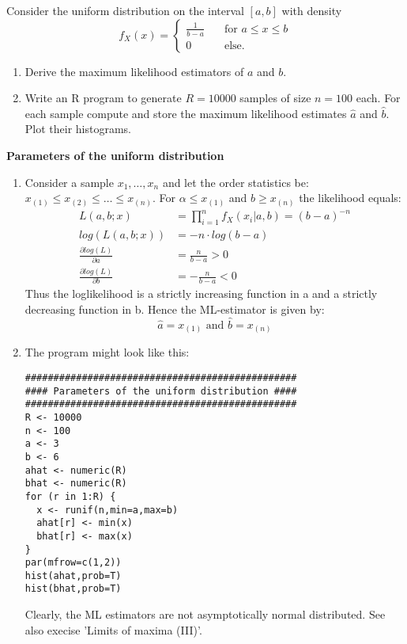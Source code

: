 \documentclass{article}
\begin{document}
Consider the uniform distribution on the interval $[a,b]$ with density%
\begin{equation*}
f_{X}(x)=\left\{
\begin{array}{ll}
\frac{1}{b-a} & \quad \text{for }a\leq x\leq b \\
0 & \quad \text{else.}%
\end{array}%
\right.
\end{equation*}

\begin{enumerate}
\item Derive the maximum likelihood estimators of $a$ and $b$.

\item Write an R program to generate $R=10000$ samples of size $n=100$ each.
For each sample compute and store the maximum likelihood estimates $\hat{a}$
and $\hat{b}$. Plot their histograms.
\end{enumerate}

\begin{solution}
\textbf{Parameters of the uniform distribution}
\begin{enumerate}
  \item Consider a sample $x_1,\dots,x_n$ and let the order statistics
      be: $x_{(1)} \leq x_{(2)} \leq \dots \leq x_{(n)}$. For $\alpha
      \leq x_{(1)}$ and $b \geq x_{(n)}$ the likelihood equals:
      \begin{align*}
        L(a,b;x) &= \prod_{i=1}^n f_X(x_i|a,b) = (b-a)^{-n}\\
        log(L(a,b;x)) &= -n\cdot log(b-a)\\
        \frac{\partial log(L)}{\partial a} &= \frac{n}{b-a} >0\\
        \frac{\partial log(L)}{\partial b} &= -\frac{n}{b-a} <0
      \end{align*}
      Thus the loglikelihood is a strictly increasing function in a and a
      strictly decreasing function in b. Hence the ML-estimator is given
      by:
      \begin{equation*}
        \hat{a} = x_{(1)} \text{ and }\hat{b} = x_{(n)}
      \end{equation*}
  \item The program might look like this:
\begin{verbatim}
################################################
#### Parameters of the uniform distribution ####
################################################
R <- 10000
n <- 100
a <- 3
b <- 6
ahat <- numeric(R)
bhat <- numeric(R)
for (r in 1:R) {
  x <- runif(n,min=a,max=b)
  ahat[r] <- min(x)
  bhat[r] <- max(x)
}
par(mfrow=c(1,2))
hist(ahat,prob=T)
hist(bhat,prob=T)
\end{verbatim}
Clearly, the ML estimators are not asymptotically normal distributed. See also execise 'Limits of maxima (III)'.
\end{enumerate}
\end{solution}
\end{document}
